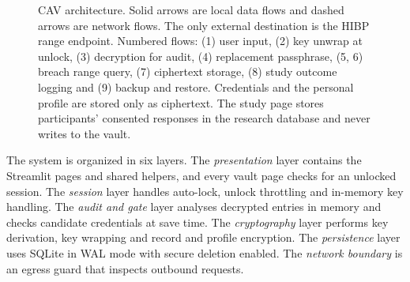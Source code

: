\documentclass[preprint,12pt]{elsarticle}
\begin{document}
\begin{figure}[t]
{}
\caption{CAV architecture. Solid arrows are local data flows and dashed arrows are network flows. The only external destination is the HIBP range endpoint. Numbered flows: (1) user input, (2) key unwrap at unlock, (3) decryption for audit, (4) replacement passphrase, (5, 6) breach range query, (7) ciphertext storage, (8) study outcome logging and (9) backup and restore. Credentials and the personal profile are stored only as ciphertext. The study page stores participants' consented responses in the research database and never writes to the vault.}
\label{fig:arch}
\end{figure}

The system is organized in six layers. The \emph{presentation} layer contains the Streamlit pages and shared helpers, and every vault page checks for an unlocked session. The \emph{session} layer handles auto-lock, unlock throttling and in-memory key handling. The \emph{audit and gate} layer analyses decrypted entries in memory and checks candidate credentials at save time. The \emph{cryptography} layer performs key derivation, key wrapping and record and profile encryption. The \emph{persistence} layer uses SQLite in WAL mode with secure deletion enabled. The \emph{network boundary} is an egress guard that inspects outbound requests.
\end{document}
